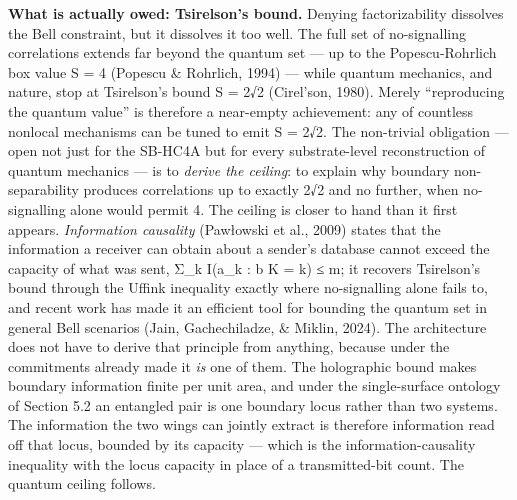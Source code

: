 \documentclass[
]{article}
\begin{document}
\textbf{What is actually owed: Tsirelson's bound.} Denying
factorizability dissolves the Bell constraint, but it dissolves it too
well. The full set of no-signalling correlations extends far beyond the
quantum set --- up to the Popescu-Rohrlich box value S = 4 (Popescu \&
Rohrlich, 1994) --- while quantum mechanics, and nature, stop at
Tsirelson's bound S = 2√2 (Cirel'son, 1980). Merely ``reproducing the
quantum value'' is therefore a near-empty achievement: any of countless
nonlocal mechanisms can be tuned to emit S = 2√2. The non-trivial
obligation --- open not just for the SB-HC4A but for every
substrate-level reconstruction of quantum mechanics --- is to
\emph{derive the ceiling}: to explain why boundary non-separability
produces correlations up to exactly 2√2 and no further, when
no-signalling alone would permit 4. The ceiling is closer to hand than
it first appears. \emph{Information causality} (Pawłowski et al., 2009)
states that the information a receiver can obtain about a sender's
database cannot exceed the capacity of what was sent, Σ\_k I(a\_k : b
\textbar{} K = k) ≤ m; it recovers Tsirelson's bound through the Uffink
inequality exactly where no-signalling alone fails to, and recent work
has made it an efficient tool for bounding the quantum set in general
Bell scenarios (Jain, Gachechiladze, \& Miklin, 2024). The architecture
does not have to derive that principle from anything, because under the
commitments already made it \emph{is} one of them. The holographic bound
makes boundary information finite per unit area, and under the
single-surface ontology of Section 5.2 an entangled pair is one boundary
locus rather than two systems. The information the two wings can jointly
extract is therefore information read off that locus, bounded by its
capacity --- which is the information-causality inequality with the
locus capacity in place of a transmitted-bit count. The quantum ceiling
follows.
\end{document}
